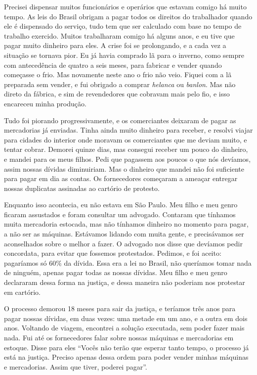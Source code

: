 Precisei dispensar muitos funcionários e operários que estavam 
comigo há muito tempo. As leis do Brasil obrigam a pagar todos os
direitos do trabalhador quando ele é dispensado do serviço, tudo tem que ser calculado com base no tempo de trabalho exercido.
Muitos trabalharam comigo há alguns anos, e eu tive que pagar muito
dinheiro para eles. A crise foi se prolongando, e a cada vez a situação se
tornava pior. Eu já havia comprado lã para o inverno, como
sempre com antecedência de quatro a seis meses, para fabricar e vender quando começasse o frio. Mas novamente neste ano o frio não veio.
Fiquei com a lã preparada sem vender, e fui obrigado a comprar \textit{helanca} ou
\textit{banlon}. Mas não direto da fábrica, e sim de revendedores que cobravam mais
pelo fio, e isso encareceu minha produção.

Tudo foi piorando progressivamente, e os comerciantes deixaram de pagar as
mercadorias já enviadas. Tinha ainda muito dinheiro para
receber, e resolvi viajar para cidades do interior onde moravam os comerciantes que me
deviam muito, e tentar cobrar. Demorei quinze dias, mas consegui receber
um pouco do dinheiro, e mandei para os meus filhos. Pedi que pagassem aos poucos o que nós devíamos, assim nossas dívidas
diminuiriam. Mas o dinheiro que mandei não foi suficiente para pagar em dia
as contas. Os fornecedores começaram a ameaçar entregar
nossas duplicatas assinadas ao cartório de protesto.

Enquanto isso acontecia, eu não estava em São Paulo. Meu filho e meu
genro ficaram assustados e foram consultar um advogado. Contaram que tínhamos muita mercadoria estocada,
mas não tínhamos dinheiro no momento para pagar, a não ser as
máquinas. Estávamos lidando com muita gente, e precisávamos ser aconselhados 
sobre o melhor a fazer. O advogado nos disse que
devíamos pedir concordata, para evitar que fossemos protestados. Pedimos, e foi aceito: pagaríamos só 60\% da dívida. Essa era a lei no Brasil, não queríamos tomar
nada de ninguém, apenas pagar todas as nossas dívidas. Meu filho e
meu genro declararam dessa forma na justiça, e dessa maneira não poderiam nos
protestar em cartório.

O processo demorou 18 meses para sair da justiça, e teríamos
três anos para pagar nossas dívidas, em duas vezes: uma metade em um ano, e a
outra em dois anos. Voltando de viagem, encontrei a solução executada, sem poder fazer mais nada. Fui até os fornecedores falar sobre nossas
máquinas e mercadorias em estoque. Disse para eles ``Vocês não 
terão que esperar tanto tempo, o processo já está na justiça. Preciso apenas dessa ordem para poder vender minhas máquinas e mercadorias. Assim que tiver, 
poderei pagar''.

